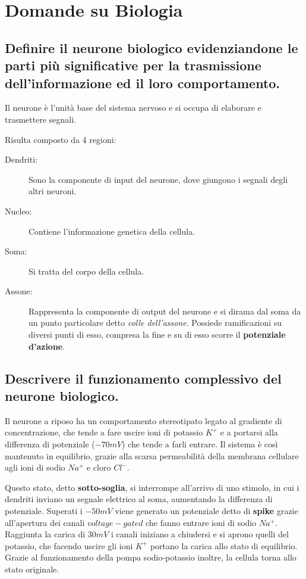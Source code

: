 \documentclass[\main/main.tex]{subfiles}
\begin{document}
\section{Domande su Biologia}
\subsection{Definire il neurone biologico evidenziandone le parti più significative per la trasmissione dell'informazione ed il loro comportamento.}
Il neurone è l'unità base del sistema nervoso e si occupa di elaborare e trasmettere segnali.

Risulta composto da 4 regioni:
\begin{description}
  \item[Dendriti:] Sono la componente di input del neurone, dove giungono i segnali degli altri neuroni.
  \item[Nucleo:] Contiene l'informazione genetica della cellula.
  \item[Soma:] Si tratta del corpo della cellula.
  \item[Assone:] Rappresenta la componente di output del neurone e si dirama dal soma da un punto particolare detto \textit{colle dell'assone}. Possiede ramificazioni su diversi punti di esso, compresa la fine e su di esso scorre il \textbf{potenziale d'azione}.
\end{description}

\subsection{Descrivere il funzionamento complessivo del neurone biologico.}
Il neurone a riposo ha un comportamento stereotipato legato al gradiente di concentrazione, che tende a fare uscire ioni di potassio $K^+$ e a portarsi alla differenza di potenziale ($-70mV$) che tende a farli entrare. Il sistema è così mantenuto in equilibrio, grazie alla scarsa permeabilità della membrana cellulare agli ioni di sodio $Na^+$ e cloro $Cl^-$.

Questo stato, detto \textbf{sotto-soglia}, si interrompe all'arrivo di uno stimolo, in cui i dendriti inviano un segnale elettrico al soma, aumentando la differenza di potenziale. Superati i $-50mV$ viene generato un potenziale detto di \textbf{spike} grazie all'apertura dei canali $voltage-gated$ che fanno entrare ioni di sodio $Na^+$. Raggiunta la carica di $30mV$ i canali iniziano a chiudersi e si aprono quelli del potassio, che facendo uscire gli ioni $K^+$ portano la carica allo stato di equilibrio. Grazie al funzionamento della pompa sodio-potassio inoltre, la cellula torna allo stato originale.
\end{document}
